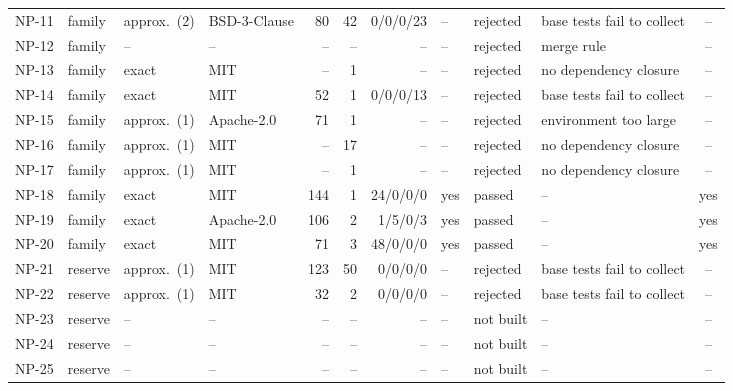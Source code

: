 \begin{table}[t]
\begin{tabular}{llllrrrlllc}
NP-11 & family & approx.\ (2) & BSD-3-Clause & 80 & 42 & 0/0/0/23 & -- & rejected & base tests fail to collect & -- \\
NP-12 & family & -- & -- & -- & -- & -- & -- & rejected & merge rule & -- \\
NP-13 & family & exact & MIT & -- & 1 & -- & -- & rejected & no dependency closure & -- \\
NP-14 & family & exact & MIT & 52 & 1 & 0/0/0/13 & -- & rejected & base tests fail to collect & -- \\
NP-15 & family & approx.\ (1) & Apache-2.0 & 71 & 1 & -- & -- & rejected & environment too large & -- \\
NP-16 & family & approx.\ (1) & MIT & -- & 17 & -- & -- & rejected & no dependency closure & -- \\
NP-17 & family & approx.\ (1) & MIT & -- & 1 & -- & -- & rejected & no dependency closure & -- \\
NP-18 & family & exact & MIT & 144 & 1 & 24/0/0/0 & yes & passed & -- & yes \\
NP-19 & family & exact & Apache-2.0 & 106 & 2 & 1/5/0/3 & yes & passed & -- & yes \\
NP-20 & family & exact & MIT & 71 & 3 & 48/0/0/0 & yes & passed & -- & yes \\
NP-21 & reserve & approx.\ (1) & MIT & 123 & 50 & 0/0/0/0 & -- & rejected & base tests fail to collect & -- \\
NP-22 & reserve & approx.\ (1) & MIT & 32 & 2 & 0/0/0/0 & -- & rejected & base tests fail to collect & -- \\
NP-23 & reserve & -- & -- & -- & -- & -- & -- & not built & -- & -- \\
NP-24 & reserve & -- & -- & -- & -- & -- & -- & not built & -- & -- \\
NP-25 & reserve & -- & -- & -- & -- & -- & -- & not built & -- & -- \\
\bottomrule\end{tabular}\end{table}
